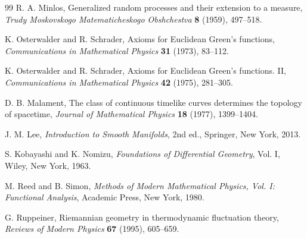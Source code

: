 \begin{thebibliography}{99}
R. A. Minlos,
Generalized random processes and their extension to a measure,
\emph{Trudy Moskovskogo Matematicheskogo Obshchestva} \textbf{8} (1959), 497--518.

K. Osterwalder and R. Schrader,
Axioms for Euclidean Green's functions,
\emph{Communications in Mathematical Physics} \textbf{31} (1973), 83--112.

K. Osterwalder and R. Schrader,
Axioms for Euclidean Green's functions. II,
\emph{Communications in Mathematical Physics} \textbf{42} (1975), 281--305.

D. B. Malament,
The class of continuous timelike curves determines the topology of spacetime,
\emph{Journal of Mathematical Physics} \textbf{18} (1977), 1399--1404.

J. M. Lee,
\emph{Introduction to Smooth Manifolds}, 2nd ed.,
Springer, New York, 2013.

S. Kobayashi and K. Nomizu,
\emph{Foundations of Differential Geometry}, Vol. I,
Wiley, New York, 1963.

M. Reed and B. Simon,
\emph{Methods of Modern Mathematical Physics, Vol. I: Functional Analysis},
Academic Press, New York, 1980.

G. Ruppeiner,
Riemannian geometry in thermodynamic fluctuation theory,
\emph{Reviews of Modern Physics} \textbf{67} (1995), 605--659.

\end{thebibliography}
